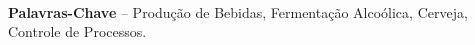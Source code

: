 \documentclass[]{politex}
\begin{document}
\capa
\falsafolhaderosto
\folhaderosto














\begin{resumo}

%
\\[3\baselineskip]
%
\textbf{Palavras-Chave} -- Produção de Bebidas, Fermentação Alcoólica, Cerveja, Controle de Processos.
\end{resumo}




\listadefiguras
\listadetabelas



\end{document}
